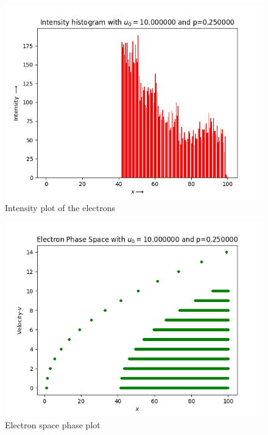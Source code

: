 \documentclass[11pt, a4paper]{article}
\begin{document}
\begin{figure}[!tbh]
\centering
\includegraphics[scale=0.56]{hist3_intensity.png} 
\caption{Intensity plot of the electrons}
\label{fig:2fig_2}
\end{figure} 

\begin{figure}[!tbh]
\centering
\includegraphics[scale=0.6]{elec_phasa_space3.png} 
\caption{Electron space phase plot}
\label{fig:2fig_3}
\end{figure} 
\end{document}
